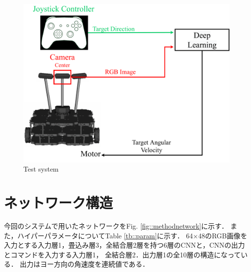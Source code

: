 \begin{figure}[h]
    \centering
    \includegraphics[width = 12cm]{./figs/system_test.pdf}
    \caption{Test system}
    \label{fig::testsystem}
\end{figure}

\newpage
\section{ネットワーク構造}
\label{net}
今回のシステムで用いたネットワークをFig. \ref{fig::methodnetwork}に示す．
また，ハイパーパラメータについてTable \ref{tb::param}に示す．
64×48のRGB画像を入力とする入力層1，畳込み層3，全結合層2層を持つ6層のCNNと，CNNの出力とコマンドを入力する入力層1，
全結合層2．出力層1の全10層の構造になっている．
出力はヨー方向の角速度を連続値である．

